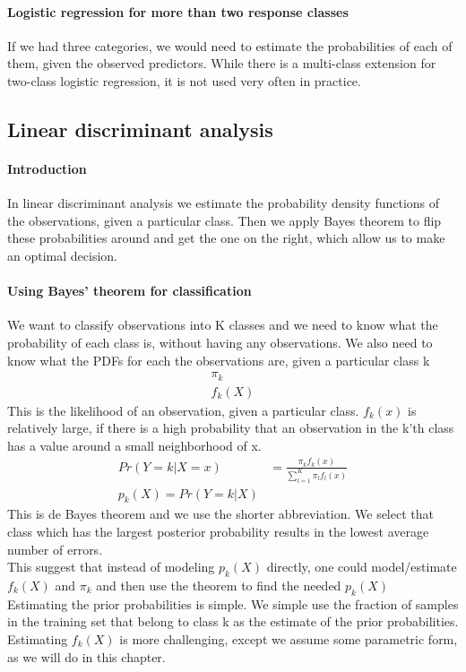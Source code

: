 \documentclass[../document.tex]{subfiles}
\begin{document}
	\paragraph{Logistic regression for more than two response classes}
	If we had three categories, we would need to estimate the probabilities of each of them, given the observed predictors. While there is a multi-class extension for two-class logistic regression, it is not used very often in practice.

	\subsection{Linear discriminant analysis}

	\paragraph{Introduction}
	In linear discriminant analysis we estimate the probability density functions of the observations, given a particular class. Then we apply Bayes theorem to flip these probabilities around and get the one on the right, which allow us to make an optimal decision.

	\paragraph{Using Bayes' theorem for classification}
	We want to classify observations into K classes and we need to know what the probability of each class is, without having any observations.
	We also need to know what the PDFs for each the observations are, given a particular class k
	\begin{equation}
	\begin{split}
		\pi_{k}\\
		f_{k}(X)
	\end{split}
	\end{equation}
	This is the likelihood of an observation, given a particular class. \(f_{k}(x)\) is relatively large, if there is a high probability that an observation in the k'th class has a value around a small neighborhood of x.
	\begin{equation}
	\begin{split}
		Pr(Y=k|X=x)&=\frac{\pi_{k}f_{k}(x)}{\sum_{l=1}^{K}\pi_{l}f_{l}(x)}\\
		p_{k}(X)=Pr(Y=k|X)&
	\end{split}
	\end{equation}
	This is de Bayes theorem and we use the shorter abbreviation. We select that class which has the largest posterior probability results in the lowest average number of errors.\\
	This suggest that instead of modeling \(p_{k}(X)\) directly, one could model/estimate \(f_{k}(X)\) and \(\pi_{k}\) and then use the theorem to find the needed \(p_{k}(X)\)\\
	Estimating the prior probabilities is simple. We simple use the fraction of samples in the training set that belong to class k as the estimate of the prior probabilities.\\
	Estimating \(f_{k}(X)\) is more challenging, except we assume some parametric form, as we will do in this chapter.
\end{document}
